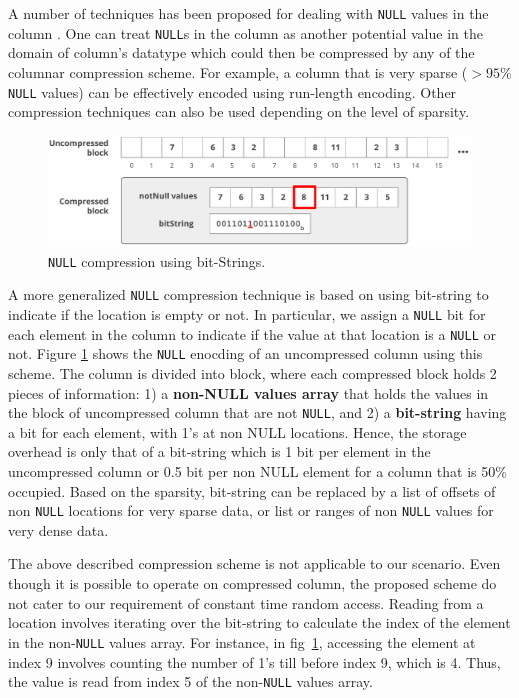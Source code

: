 A number of techniques has been proposed for dealing with \texttt{NULL} values in the column \cite{abadi-sparse-col}. One can treat \texttt{NULL}s in the column as another potential value in the domain of column's datatype which could then be compressed by any of the columnar compression scheme. For example, a column that is very sparse ($>95\%$ \texttt{NULL} values) can be effectively encoded using run-length encoding. Other compression techniques can also be used depending on the level of sparsity.

\begin{figure}
	\vspace{-20pt}
	\hfill\includegraphics[scale=0.70]{img/null1}\hspace*{\fill}
	\captionsetup{justification=centering}
	\caption{\texttt{NULL} compression using bit-Strings.}
	\label{fig:null1}
	\vspace{-5pt}
\end{figure}

A more generalized \texttt{NULL} compression technique is based on using bit-string to indicate if the location is empty or not. In particular, we assign a \texttt{NULL} bit for each element in the column to indicate if the value at that location is a \texttt{NULL} or not. Figure \ref{fig:null1} shows the \texttt{NULL} enocding of an uncompressed column using this scheme. The column is divided into block, where each compressed block holds 2 pieces of information: 1) a \textbf{non-NULL values array} that holds the values in the block of uncompressed column that are not \texttt{NULL}, and 2) a \textbf{bit-string} having a bit for each element, with 1's at non NULL locations. Hence, the storage overhead is only that of a bit-string which is 1 bit per element in the uncompressed column or 0.5 bit per non NULL element for a column that is 50\% occupied. Based on the sparsity, bit-string can be replaced by a list of offsets of non \texttt{NULL} locations for very sparse data, or list or ranges of non \texttt{NULL} values for very dense data.

The above described compression scheme is not applicable to our scenario. Even though it is possible to operate on compressed column, the proposed scheme do not cater to our requirement of constant time random access. Reading from a location involves iterating over the bit-string to calculate the index of the element in the non-\texttt{NULL} values array. For instance, in fig~\ref{fig:null1}, accessing the element at index 9 involves counting the number of 1's till before index 9, which is 4. Thus, the value is read from index 5 of the non-\texttt{NULL} values array.

